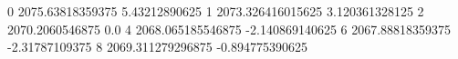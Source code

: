 0 2075.63818359375 5.43212890625
1 2073.326416015625 3.120361328125
2 2070.2060546875 0.0
4 2068.065185546875 -2.140869140625
6 2067.88818359375 -2.31787109375
8 2069.311279296875 -0.894775390625
